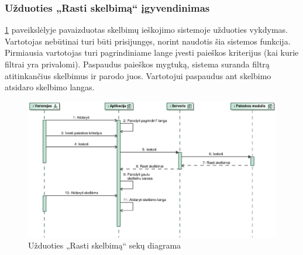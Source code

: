 \documentclass[12pt]{article}
\begin{document}
	\subsubsection{Užduoties „Rasti skelbimą“ įgyvendinimas}
	\ref{FindAdvertSeq} paveikslėlyje pavaizduotas skelbimų ieškojimo sistemoje užduoties vykdymas. Vartotojas nebūtinai turi būti prisijungęs, norint naudotis šia sistemos funkcija. Pirmiausia vartotojas turi pagrindiniame lange įvesti paieškos kriterijus (kai kurie filtrai yra privalomi). Paspaudus paieškos mygtuką, sistema suranda filtrą atitinkančius skelbimus ir parodo juos. Vartotojui paspaudus ant skelbimo atsidaro skelbimo langas.
	\begin{figure}[h]
		\begin{center}
			\includegraphics[width=\textwidth]{RastiSkelbima.eps}
			\caption{Užduoties „Rasti skelbimą“ sekų diagrama\label{FindAdvertSeq}}
		\end{center}
	\end{figure}
	
	
	\pagebreak
	
\end{document}
